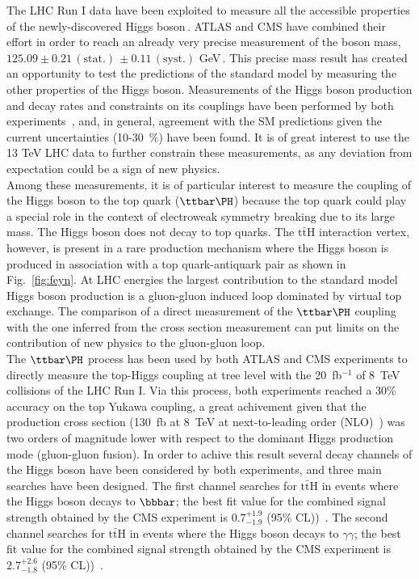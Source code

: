 The LHC Run I data have been exploited to measure all the accessible
properties of the newly-discovered Higgs
boson\,\cite{cms_higgs,atlas_higgs}. ATLAS and CMS have combined their
effort in order to reach an already very precise measurement of the
boson mass, $125.09\pm 0.21\,(\mathrm{stat.})\,\pm 0.11\,(\mathrm{syst.})$
GeV\,\cite{atlas_cms_mass}. This precise mass result has created an
opportunity to test the predictions of the standard model by measuring
the other properties of the Higgs boson. Measurements of the Higgs boson production and decay rates and
constraints on its couplings have been performed by both
experiments~\cite{atlas_couplings,cms_couplings},
and, in general, agreement with the SM predictions given the current uncertainties
(10-30~$\%$) have been found. It is of great interest to use
the 13 TeV LHC data to further constrain these measurements, as any deviation from
expectation could be a sign of new physics.\\

Among these measurements, it is of particular interest to measure the coupling of the Higgs
boson to the top quark ($\ttbar \PH$) because the top quark
could play a special role in the context of electroweak symmetry
breaking due to its large mass.  The Higgs boson does not decay to top quarks. The
$\mathrm{t \bar t H}$ interaction vertex, however, is present in a
rare production mechanism where the Higgs boson is produced in
association with a top quark-antiquark pair as shown in
Fig.~\ref{fig:feyn}.  At LHC energies the largest contribution to the standard
model Higgs boson production is a gluon-gluon induced loop
dominated by virtual top exchange. The comparison of a direct
measurement of the $\ttbar \PH$ coupling with the one inferred from
the cross section measurement can put limits on the contribution of
new physics to the gluon-gluon loop.\\

The $\ttbar \PH$ process has been used by both ATLAS and CMS experiments to directly measure the
top-Higgs coupling at tree level with the 20~fb$^{-1}$ of 8~TeV
collisions of the LHC Run I. Via this process, both experiments reached a
30$\%$ accuracy on the top Yukawa coupling, a great achivement
given that the production cross section (130~fb at 8~TeV at
next-to-leading order (NLO)~\cite{YellowReport}) was two orders of magnitude
lower with respect to the dominant Higgs production mode (gluon-gluon
fusion). In order to achive this result several decay channels of the
Higgs boson have been considered by both experiments, and three main searches have
been designed. The first channel searches for
$\mathrm{t \bar t H}$ in events where the Higgs boson decays to
$\bbbar$; the best fit value for the combined signal strength obtained
by the CMS experiment is $0.7^{+1.9}_{-1.9}$ (95\%
CL))~\cite{cms_ttH}. The second channel searches 
for $\mathrm{t \bar t H}$ in events where the Higgs boson decays to
$\gamma \gamma$; the best fit value for the combined signal strength obtained
by the CMS experiment is $2.7^{+2.6}_{-1.8}$ (95\%
CL))~\cite{cms_ttH}. \\ 

